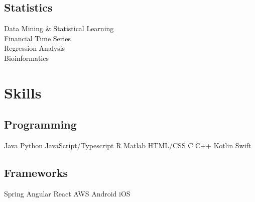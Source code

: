 \documentclass[letterpaper]{deedy-resume} %
\begin{document}
\begin{minipage}[t]{0.33\textwidth}
\sectionspace %

\subsection{Statistics}
Data Mining \& Statistical Learning\\
Financial Time Series\\
Regression Analysis\\
Bioinformatics\\

\sectionspace %


\section{Skills}

\subsection{Programming}

Java \textbullet{}
Python \textbullet{}
JavaScript/Typescript \textbullet{}
R \textbullet{}
Matlab \textbullet{}
HTML/CSS \textbullet{}
C \textbullet{}
C++ \textbullet{}
Kotlin \textbullet{}
Swift

\sectionspace %

\subsection{Frameworks}
Spring \textbullet{}
Angular \textbullet{}
React \textbullet{}
AWS \textbullet{}
Android \textbullet{}
iOS

\sectionspace %


\end{minipage} %
\hfill
%
%
\end{document}
